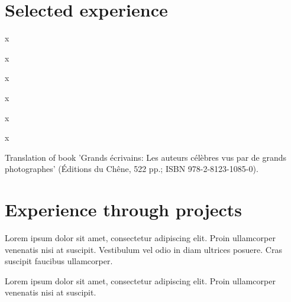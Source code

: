 \documentclass[]{plushcv}
\begin{document}
\begin{minipage}[t]{0.70\textwidth} 



\section{Selected experience}

\vspace{\topsep} %
\begin{tightemize}
\sectionsep
\item x
\item x
\end{tightemize}
\sectionsep

\begin{tightemize}
\sectionsep
\item x
\item x
\end{tightemize}
\sectionsep

\begin{tightemize}
\sectionsep
\item x
\item x
\end{tightemize}
\sectionsep

Translation of book 'Grands écrivains: Les auteurs célèbres vus par de grands photographes' (Éditions du Chêne, 522 pp.; ISBN 978-2-8123-1085-0).
\sectionsep



\section{Experience through projects}

\begin{tightemize}
\item Lorem ipsum dolor sit amet, consectetur adipiscing elit. Proin ullamcorper venenatis nisi at suscipit. Vestibulum vel odio in diam ultrices posuere. Cras suscipit faucibus ullamcorper.
\item Lorem ipsum dolor sit amet, consectetur adipiscing elit. Proin ullamcorper venenatis nisi at suscipit.
\end{tightemize}
\sectionsep


\end{minipage}
\end{document}
